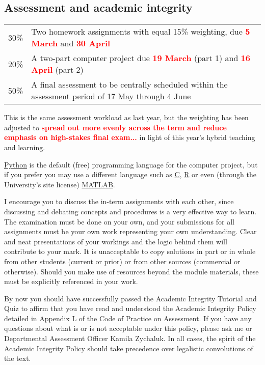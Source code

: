 \documentclass[12 pt]{article}
\newcommand{\TODO}[1]{\textcolor{red}{\textbf{#1}}}
\begin{document}
{\subsection*{Assessment and academic integrity}
\begin{tabular}{ll}
  30\% & Two homework assignments with equal 15\% weighting, due \TODO{5 March} and \TODO{30 April} \\ %
  20\% & A two-part computer project due \TODO{19 March} (part 1) and \TODO{16 April} (part 2) \\
  50\% & A final assessment to be centrally scheduled within the assessment period of 17 May through 4 June \\
\end{tabular}

This is the same assessment workload as last year, but the weighting has been adjusted to \TODO{spread out more evenly across the term and reduce emphasis on high-stakes final exam...}
in light of this year's hybrid teaching and learning.



\href{https://www.python.org}{Python} is the default (free) programming language for the computer project, but if you prefer you may use a different language such as \href{https://en.wikipedia.org/wiki/C_(programming_language)}{C}, \href{https://www.r-project.org}{R} or even (through the University's site license) \href{https://matlab.mathworks.com}{MATLAB}.

I encourage you to discuss the in-term assignments with each other, since discussing and debating concepts and procedures is a very effective way to learn.
The examination must be done on your own, and your submissions for all assignments must be your own work representing your own understanding.
Clear and neat presentations of your workings and the logic behind them will contribute to your mark.
It is unacceptable to copy solutions in part or in whole from other students (current or prior) or from other sources (commercial or otherwise).
Should you make use of resources beyond the module materials, these must be explicitly referenced in your work.

By now you should have successfully passed the Academic Integrity Tutorial and Quiz to affirm that you have read and understood the Academic Integrity Policy detailed in Appendix L of the Code of Practice on Assessment.
If you have any questions about what is or is not acceptable under this policy, please ask me or Departmental Assessment Officer Kamila Zychaluk.
In all cases, the spirit of the Academic Integrity Policy should take precedence over legalistic convolutions of the text.



}
\end{document}
